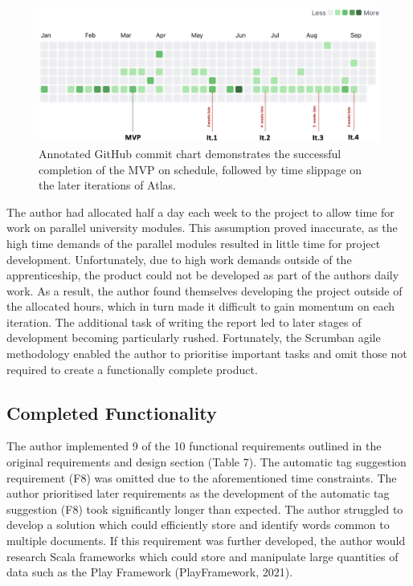 \documentclass{article}
\begin{document}
\begin{figure}[!htb]
  \centering
      \includegraphics[width=1\textwidth]{images/timeline.png}
  \caption{Annotated GitHub commit chart demonstrates the successful completion of the MVP on schedule, followed by time slippage on the later iterations of Atlas.}
\end{figure}

The author had allocated half a day each week to the project to allow time for work on parallel university modules. This assumption proved inaccurate, as the high time demands of the parallel modules resulted in little time for project development. Unfortunately, due to high work demands outside of the apprenticeship, the product could not be developed as part of the authors daily work. As a result, the author found themselves developing the project outside of the allocated hours, which in turn made it difficult to gain momentum on each iteration. The additional task of writing the report led to later stages of development becoming particularly rushed. Fortunately, the Scrumban agile methodology enabled the author to prioritise important tasks and omit those not required to create a functionally complete product.

\subsection{Completed Functionality}

The author implemented 9 of the 10 functional requirements outlined in the original requirements and design section (Table 7). The automatic tag suggestion requirement (F8) was omitted due to the aforementioned time constraints. The author prioritised later requirements as the development of the automatic tag suggestion (F8) took significantly longer than expected. The author struggled to develop a solution which could efficiently store and identify words common to multiple documents. If this requirement was further developed, the author would research Scala frameworks which could store and manipulate large quantities of data such as the Play Framework (PlayFramework, 2021).
\end{document}
